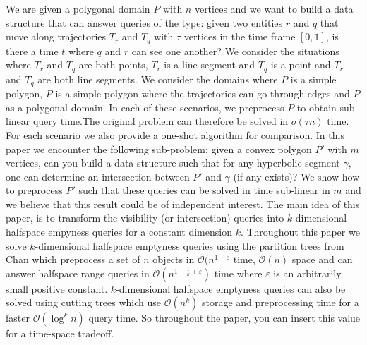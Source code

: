 \documentclass[a4paper, UKenglish]{lipics-v2018}
\begin{document}
We are given a polygonal domain $P$ with $n$ vertices and we want to build a data structure that can answer queries of the type: given two entities $r$ and $q$ that move along trajectories $T_r$ and $T_q$ with $\tau$ vertices in the time frame $[0,1]$,  is there a time $t$ where $q$ and $r$ can see one another? We consider the situations where $T_r$ and $T_q$ are both points, $T_r$ is a line segment and $T_q$ is a point and $T_r$ and $T_q$ are both line segments. We consider the domains where $P$ is a simple polygon, $P$ is a simple polygon where the trajectories can go through edges and $P$ as a polygonal domain. In each of these scenarios, we preprocess $P$ to obtain sub-linear query time.The original problem can therefore be solved in $o(\tau n)$ time.  For each scenario we also provide a one-shot algorithm for comparison. In this paper we encounter the following sub-problem: given a convex polygon $P'$ with $m$ vertices, can you build a data structure such that for any hyperbolic segment $\gamma$, one can determine an intersection between $P'$ and $\gamma$ (if any exists)? We show how to preprocess $P'$ such that these queries can be solved in time sub-linear in $m$ and we believe that this result could be of independent interest. The main idea of this paper, is to transform the visibility (or intersection) queries into $k$-dimensional halfspace empyness queries for a constant dimension $k$. Throughout this paper we solve $k$-dimensional halfspace emptyness queries using the partition trees from Chan \cite{chan2012optimal} which preprocess a set of $n$ objects in $\mathcal{O}(n^{1+ \varepsilon}$ time, $\mathcal{O}(n)$ space and can answer halfspace range queries in $\mathcal{O}(n^{1 - \frac{1}{k} + \varepsilon})$ time where $\varepsilon$ is an arbitrarily small positive constant. $k$-dimensional halfspace emptyness queries can also be solved using cutting trees which use $\mathcal{O}(n^{k})$ storage and preprocessing time for a faster $\mathcal{O}(\log^k n)$ query time. So throughout the paper, you can insert this value for a time-space tradeoff.
\end{document}
